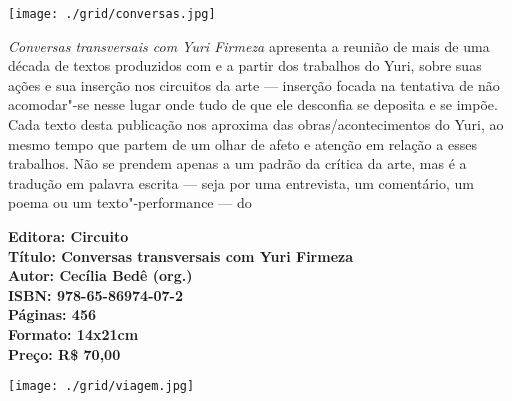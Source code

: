 \pagebreak

\begin{center}
\hspace*{-3.6cm}
\hspace*{3.1cm}\texttt{[image: ./grid/conversas.jpg]}
\end{center}

\hspace*{-7cm}\hrulefill\hspace*{-7cm}

\medskip

\noindent{}\textit{Conversas transversais com Yuri Firmeza} apresenta a reunião de mais de uma década de textos produzidos com e a partir dos trabalhos do Yuri, sobre suas ações e sua inserção nos circuitos da arte — inserção focada na tentativa de não acomodar"-se nesse lugar onde tudo de que ele desconfia se deposita e se impõe.
Cada texto desta publicação nos aproxima das obras/acontecimentos do Yuri, ao mesmo tempo que partem de um olhar de afeto e atenção em relação a esses trabalhos. Não se prendem apenas a um padrão da crítica da arte, mas é a tradução em palavra escrita --- seja por uma entrevista, um comentário, um poema ou um texto"-performance --- do 


\vfill

\hspace*{-.4cm}\begin{minipage}[c]{1\linewidth}
\small\textbf{
\hspace*{-.1cm}Editora: Circuito\\
Título: Conversas transversais com Yuri Firmeza\\
Autor: Cecília Bedê (org.)\\ 
ISBN: 978-65-86974-07-2\\
Páginas: 456\\
Formato: 14x21cm\\
Preço: R\$ 70,00\\
}
\end{minipage}



\pagebreak

\begin{center}
\hspace*{.5cm}\texttt{[image: ./grid/viagem.jpg]}
\end{center}


